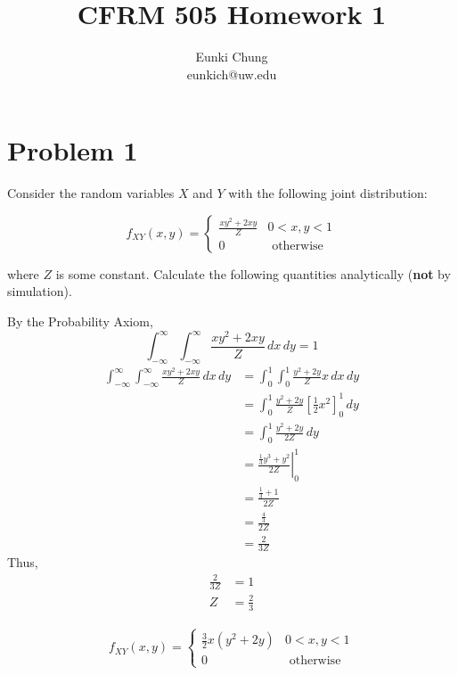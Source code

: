 \documentclass[11pt]{article}
\title{CFRM 505 Homework 1}
\author{Eunki Chung \\
    \small{eunkich@uw.edu}}
\begin{document}
    
    \maketitle
    
    

    
    \hypertarget{problem-1}{%
\section{Problem 1}\label{problem-1}}

Consider the random variables \(X\) and \(Y\) with the following joint
distribution:

\[f_{XY}(x, y) = \left\{ \begin{array}{cc} \frac{xy^2 + 2xy}{Z} & 0 < x, y < 1 \\ 0 & \textrm{ otherwise} \end{array} \right.\]

where \(Z\) is some constant. Calculate the following quantities
analytically (\textbf{not} by simulation).

    By the Probability Axiom, 
    $$\int_{- \infty}^{\infty} \int_{- \infty}^{\infty} \frac{xy^2 + 2xy}{Z}\, dx\, dy = 1 $$
    \begin{align*}
        \int_{- \infty}^{\infty} \int_{- \infty}^{\infty} \frac{xy^2 + 2xy}{Z}\, dx\, dy &= 
        \int_{0}^{1} \int_{0}^{1} \frac{y^2 + 2y}{Z}x\, dx\, dy \\
        &= \int_{0}^{1} \frac{y^2 + 2y}{Z} \left[ \frac{1}{2} x^2 \right]^1_0 \, dy \\ 
    &= \int_{0}^{1} \frac{y^2 + 2y}{2Z} \, dy \\ 
    &= \left. \frac{\frac{1}{3} y^3 + y^2}{2Z} \right \vert^1_0 \\ 
    &= \frac{\frac{1}{3} + 1}{2Z} \\ 
    &= \frac{\frac{4}{3} }{2Z} \\
    &= \frac{2}{3Z}
    \end{align*}
    Thus, 
    \begin{align*}
        \frac{2}{3Z} &= 1 \\ 
        Z &= \frac{2}{3}
    \end{align*}

    \begin{align*}
        f_{XY}(x, y) = \left\{ \begin{array}{cc} \frac{3}{2}x(y^2 + 2y) & 0 < x, y < 1 \\ 0 & \textrm{ otherwise} \end{array} \right.
    \end{align*}
    \\
\end{document}
